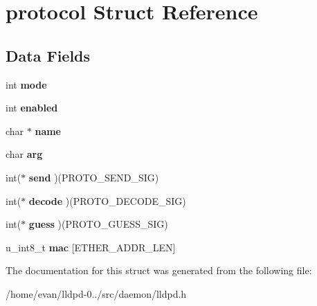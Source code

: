 \section{protocol \-Struct \-Reference}
\label{structprotocol}
\subsection*{\-Data \-Fields}
\begin{DoxyCompactItemize}
\item 
int {\bfseries mode}\label{structprotocol_a1ea5d0cb93f22f7d0fdf804bd68c3326}

\item 
int {\bfseries enabled}\label{structprotocol_a03e6cca0c879c0443efb431c30c14f76}

\item 
char $\ast$ {\bfseries name}\label{structprotocol_a5ac083a645d964373f022d03df4849c8}

\item 
char {\bfseries arg}\label{structprotocol_a58d8be2a496c3e9251d793a9399e8a35}

\item 
int($\ast$ {\bfseries send} )(\-P\-R\-O\-T\-O\-\_\-\-S\-E\-N\-D\-\_\-\-S\-I\-G)\label{structprotocol_afd9ceac78cab7597cdd54ec177993348}

\item 
int($\ast$ {\bfseries decode} )(\-P\-R\-O\-T\-O\-\_\-\-D\-E\-C\-O\-D\-E\-\_\-\-S\-I\-G)\label{structprotocol_afc78ea716479fe094cc3e75d854882c3}

\item 
int($\ast$ {\bfseries guess} )(\-P\-R\-O\-T\-O\-\_\-\-G\-U\-E\-S\-S\-\_\-\-S\-I\-G)\label{structprotocol_acef54be10e56e69b8b5947b080fb976a}

\item 
u\-\_\-int8\-\_\-t {\bfseries mac} [\-E\-T\-H\-E\-R\-\_\-\-A\-D\-D\-R\-\_\-\-L\-E\-N]\label{structprotocol_a36b7d04eb95f3346908c662bfd2eb211}

\end{DoxyCompactItemize}


\-The documentation for this struct was generated from the following file\-:\begin{DoxyCompactItemize}
\item 
/home/evan/lldpd-\/0../src/daemon/lldpd.\-h\end{DoxyCompactItemize}
